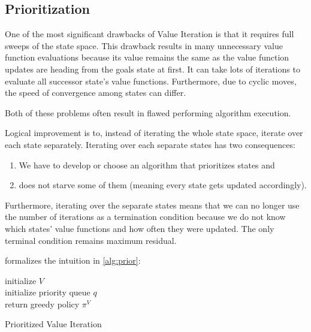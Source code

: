 \subsection{Prioritization}
One of the most significant drawbacks of Value Iteration is that it requires full sweeps of the state space. This drawback results in many unnecessary value function evaluations because its value remains the same as the value function updates are heading from the goals state at first. It can take lots of iterations to evaluate all successor state's value functions. Furthermore, due to cyclic moves, the speed of convergence among states can differ.

Both of these problems often result in flawed performing algorithm execution.

Logical improvement is to, instead of iterating the whole state space, iterate over each state separately. Iterating over each separate states has two consequences:
\begin{enumerate}
    \item We have to develop or choose an algorithm that prioritizes states and 
    \item does not starve some of them (meaning every state gets updated accordingly).
\end{enumerate}

Furthermore, iterating over the separate states means that we can no longer use the number of iterations as a termination condition because we do not know which states' value functions and how often they were updated. The only terminal condition remains maximum residual.

\cite{Kolobov2012} formalizes the intuition in \ref{alg:prior}:

\LinesNumbered
\begin{algorithm}[h!]
\SetAlgoLined
initialize $V$ \\
initialize priority queue $q$ \\
return greedy policy $\pi^{V}$
\caption{Prioritized Value Iteration}
\label{alg:prior}
\end{algorithm}


